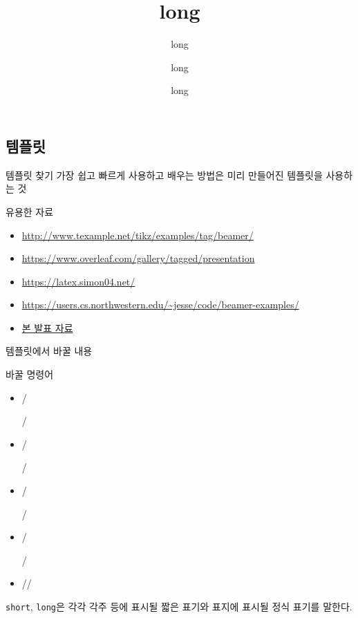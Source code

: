 \documentclass[compress]{beamer}
\begin{document}
\subsection{템플릿}
\begin{frame}{템플릿 찾기}
   가장 쉽고 빠르게 사용하고 배우는 방법은 미리 만들어진 템플릿을
  사용하는 것

  \begin{block}{유용한 자료}
    \begin{itemize}
      \item \url{http://www.texample.net/tikz/examples/tag/beamer/}
      \item \url{https://www.overleaf.com/gallery/tagged/presentation}
      \item \url{https://latex.simon04.net/}
      \item \url{https://users.cs.northwestern.edu/~jesse/code/beamer-examples/}
      \item \href{https://github.com/Zeta611/beamer-tutorial-latex-workshop-2020}{본 발표 자료}
    \end{itemize}
  \end{block}
\end{frame}

\begin{frame}[fragile]{템플릿에서 바꿀 내용}
  \begin{alertblock}{바꿀 명령어}
    \begin{itemize}
      \item \ltxverb/\title[short]{long}/
      \item \ltxverb/\subtitle[short]{long}/
      \item \ltxverb/\author[short]{long}/
      \item \ltxverb/\date[short]{long}/
      \item \ltxverb//
    \end{itemize}
  \end{alertblock}
  \verb/short/, \verb/long/은 각각 각주 등에 표시될 짧은 표기와 표지에 표시될
  정식 표기를 말한다.
\end{frame}
\end{document}
